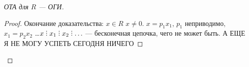 \begin{proof}[ОТА для $R$ --- ОГИ]
\begin{proof}
        Окончание доказательства: $x \in R$  $x \neq 0$.  $x = p_1 x_1$, $p_1$ неприводимо, $x_1 = p_2x_2$ \ldots $x \divby x_1 \divby x_2 \divby \ldots$ --- бесконечная цепочка, чего не может быть. А ЕЩЕ Я НЕ МОГУ УСПЕТЬ СЕГОДНЯ НИЧЕГО
    \end{proof}
\end{proof}
